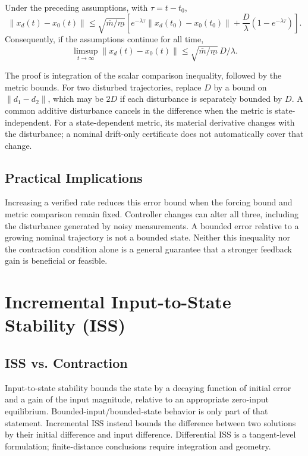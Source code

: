\begin{theorem}
\label{thm:ch4:disturbance-rejection}
Under the preceding assumptions, with $\tau=t-t_0$,
\begin{equation}
\|x_d(t)-x_0(t)\|\leq\sqrt{\overline m/\underline m}\left[
e^{-\lambda\tau}\|x_d(t_0)-x_0(t_0)\|+
\frac{D}{\lambda}(1-e^{-\lambda\tau})\right].
\label{eq:ch4:ultimate-bound}
\end{equation}
Consequently, if the assumptions continue for all time,
\begin{equation}
\limsup_{t\to\infty}\|x_d(t)-x_0(t)\|\leq
\sqrt{\overline m/\underline m}\,D/\lambda.
\label{eq:ch4:ultimate-bound-steady}
\end{equation}
\end{theorem}

The proof is integration of the scalar comparison inequality, followed by the metric bounds. For two disturbed trajectories, replace $D$ by a bound on $\|d_1-d_2\|$, which may be $2D$ if each disturbance is separately bounded by $D$. A common additive disturbance cancels in the difference when the metric is state-independent. For a state-dependent metric, its material derivative changes with the disturbance; a nominal drift-only certificate does not automatically cover that change.

\subsection{Practical Implications}

Increasing a verified rate reduces this error bound when the forcing bound and metric comparison remain fixed. Controller changes can alter all three, including the disturbance generated by noisy measurements. A bounded error relative to a growing nominal trajectory is not a bounded state. Neither this inequality nor the contraction condition alone is a general guarantee that a stronger feedback gain is beneficial or feasible.

\section{Incremental Input-to-State Stability (ISS)}

\subsection{ISS vs. Contraction}

Input-to-state stability bounds the state by a decaying function of initial error and a gain of the input magnitude, relative to an appropriate zero-input equilibrium. Bounded-input/bounded-state behavior is only part of that statement. Incremental ISS instead bounds the difference between two solutions by their initial difference and input difference. Differential ISS is a tangent-level formulation; finite-distance conclusions require integration and geometry.

